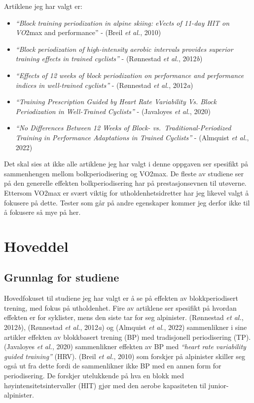 \documentclass[
  letterpaper,
  DIV=11,
  numbers=noendperiod]{scrreprt}
\providecommand{\tightlist}{%
  \setlength{\itemsep}{0pt}\setlength{\parskip}{0pt}}\usepackage{longtable,booktabs,array}
\begin{document}
Artiklene jeg har valgt er:

\begin{itemize}
\tightlist
\item
  \emph{``Block training periodization in alpine skiing: eVects of
  11-day HIT on VO}2max and performance'' - (Breil \emph{et al.}, 2010)
\item
  \emph{``Block periodization of high-intensity aerobic intervals
  provides superior training effects in trained cyclists''} - (Rønnestad
  \emph{et al.}, 2012\emph{b})
\item
  \emph{``Effects of 12 weeks of block periodization on performance and
  performance indices in well-trained cyclists''} - (Rønnestad \emph{et
  al.}, 2012\emph{a})
\item
  \emph{``Training Prescription Guided by Heart Rate Variability Vs.
  Block Periodization in Well-Trained Cyclists''} - (Javaloyes \emph{et
  al.}, 2020)
\item
  \emph{``No Differences Between 12 Weeks of Block-
  vs.~Traditional-Periodized Training in Performance Adaptations in
  Trained Cyclists''} - (Almquist \emph{et al.}, 2022)
\end{itemize}

Det skal sies at ikke alle artiklene jeg har valgt i denne oppgaven ser
spesifikt på sammenhengen mellom bolkperiodisering og VO2max. De fleste
av studiene ser på den generelle effekten bolkperiodisering har på
prestasjonsevnen til utøverne. Ettersom VO2max er svært viktig for
utholdenhetsidretter har jeg likevel valgt å fokusere på dette. Tester
som går på andre egenskaper kommer jeg derfor ikke til å fokusere så mye
på her.


\chapter{Hoveddel}\label{hoveddel}

\section{Grunnlag for studiene}\label{grunnlag-for-studiene}

Hovedfokuset til studiene jeg har valgt er å se på effekten av
blokkperiodisert trening, med fokus på utholdenhet. Fire av artiklene
ser spesifikt på hvordan effekten er for syklister, mens den siste tar
for seg alpinister. (Rønnestad \emph{et al.}, 2012\emph{b}), (Rønnestad
\emph{et al.}, 2012\emph{a}) og (Almquist \emph{et al.}, 2022)
sammenlikner i sine artikler effekten av blokkbasert trening (BP) med
tradisjonell periodisering (TP). (Javaloyes \emph{et al.}, 2020)
sammenlikner effekten av BP med \emph{``heart rate variability guided
training''} (HRV). (Breil \emph{et al.}, 2010) som forskjer på
alpinister skiller seg også ut fra dette fordi de sammenlikner ikke BP
med en annen form for periodisering. De forskjer utelukkende på hva en
blokk med høyintensitetsintervaller (HIT) gjør med den aerobe
kapasiteten til junior-alpinister.
\end{document}
